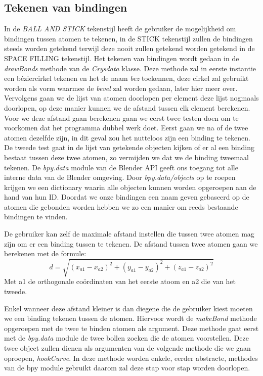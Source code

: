 \subsection{Tekenen van bindingen}    

In de \textit{BALL AND STICK} tekenstijl heeft de gebruiker de mogelijkheid om bindingen tussen atomen te tekenen, in de {STICK} tekenstijl zullen de bindingen steeds worden getekend terwijl deze nooit zullen getekend worden getekend in de {SPACE FILLING} tekenstijl. Het tekenen van bindingen wordt gedaan in de \textit{drawBonds} methode van de \textit{Crysdata} klasse. Deze methode zal in eerste instantie een béziercirkel tekenen en het de naam \textit{bez} toekennen, deze cirkel zal gebruikt worden als vorm waarmee de \textit{bevel} zal worden gedaan, later hier meer over. Vervolgens gaan we de lijst van atomen doorlopen per element deze lijst nogmaals doorlopen, op deze manier kunnen we de afstand tussen elk element berekenen. Voor we deze afstand gaan berekenen gaan we eerst twee testen doen om te voorkomen dat het programma dubbel werk doet. Eerst gaan we na of de twee atomen dezelfde zijn, in dit geval zou het nutteloos zijn een binding te tekenen. De tweede test gaat in de lijst van getekende objecten kijken of er al een binding bestaat tussen deze twee atomen, zo vermijden we dat we de binding tweemaal tekenen. De \textit{bpy.data} module van de Blender API geeft ons toegang tot alle interne data van de Blender omgeving. Door \textit{bpy.data/objects} op te roepen krijgen we een dictionary waarin alle objecten kunnen worden opgeroepen aan de hand van hun ID. Doordat we onze bindingen een naam geven gebaseerd op de atomen die gebonden worden hebben we zo een manier om reeds bestaande bindingen te vinden.
\par
De gebruiker kan zelf de maximale afstand instellen die tussen twee atomen mag zijn om er een binding tussen te tekenen. De afstand tussen twee atomen gaan we berekenen met de formule:
\[ d = \sqrt{(x_{a1}-x_{a2})^2+(y_{a1}-y_{a2})^2+(z_{a1}-z_{a2})^2}\]   
Met a1 de orthogonale coördinaten van het eerste atoom en a2 die van het tweede.
\par
Enkel wanneer deze afstand kleiner is dan diegene die de gebruiker kiest moeten we een binding tekenen tussen de atomen. Hiervoor wordt de \textit{makeBond} methode opgeroepen met de twee te binden atomen als argument. Deze methode gaat eerst met de \textit{bpy.data} module de twee bollen zoeken die de atomen voorstellen. Deze twee object zullen dienen als argumenten van de volgende methode die we gaan oproepen, \textit{hookCurve}. In deze methode worden enkele, eerder abstracte, methodes van de bpy module gebruikt daarom zal deze stap voor stap worden doorlopen.

